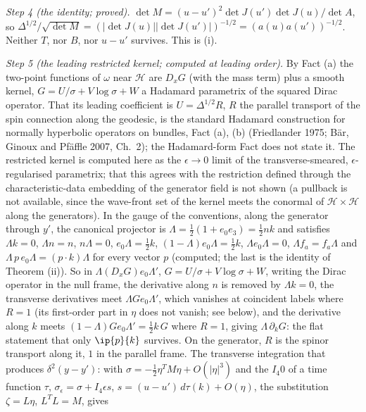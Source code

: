 \emph{Step 4 (the identity; proved).} $\det M = (u - u')^{2}\det J(u')\det J(u)/\det A$, so $\Delta^{1/2}/\sqrt{\det M} = (|\det J(u)||\det J(u')|)^{-1/2} = (a(u)a(u'))^{-1/2}$. Neither $T$, nor $B$, nor $u - u'$ survives. This is (i).

\emph{Step 5 (the leading restricted kernel; computed at leading order).} By Fact (a) the two-point functions of $\omega$ near $\mathcal{H}$ are $D_{x}G$ (with the mass term) plus a smooth kernel, $G = U/\sigma + V\log\sigma + W$ a Hadamard parametrix of the squared Dirac operator. That its leading coefficient is $U = \Delta^{1/2}R$, $R$ the parallel transport of the spin connection along the geodesic, is the standard Hadamard construction for normally hyperbolic operators on bundles, Fact (a), (b) (Friedlander 1975; B\"ar, Ginoux and Pf\"affle 2007, Ch.~2); the Hadamard-form Fact does not state it. The restricted kernel is computed here as the $\epsilon \to 0$ limit of the transverse-smeared, $\epsilon$-regularised parametrix; that this agrees with the restriction defined through the characteristic-data embedding of the generator field is not shown (a pullback is not available, since the wave-front set of the kernel meets the conormal of $\mathcal{H}\times\mathcal{H}$ along the generators). In the gauge of the conventions, along the generator through $y'$, the canonical projector is $\Lambda = \tfrac12(1 + e_{0}e_{3}) = \tfrac12 nk$ and satisfies $\Lambda k = 0$, $\Lambda n = n$, $n\Lambda = 0$, $e_{0}\Lambda = \tfrac12 k$, $(1 - \Lambda)e_{0}\Lambda = \tfrac12 k$, $\Lambda e_{0}\Lambda = 0$, $\Lambda f_{a} = f_{a}\Lambda$ and $\Lambda\,p\,e_{0}\Lambda = (p\cdot k)\Lambda$ for every vector $p$ (computed; the last is the identity of Theorem (ii)). So in $\Lambda(D_{x}G)e_{0}\Lambda'$, $G = U/\sigma + V\log\sigma + W$, writing the Dirac operator in the null frame, the derivative along $n$ is removed by $\Lambda k = 0$, the transverse derivatives meet $\Lambda G e_{0}\Lambda'$, which vanishes at coincident labels where $R = 1$ (its first-order part in $\eta$ does not vanish; see below), and the derivative along $k$ meets $(1 - \Lambda)Ge_{0}\Lambda' = \tfrac12 k\,G$ where $R = 1$, giving $\Lambda\,\partial_{k}G$: the flat statement that only $\ip{p}{k}$ survives. On the generator, $R$ is the spinor transport along it, $1$ in the parallel frame. The transverse integration that produces $\delta^{2}(y - y')$: with $\sigma = -\tfrac12\eta^{T}M\eta + O(|\eta|^{3})$ and the $I_{4}0$ of a time function $\tau$, $\sigma_{\epsilon} = \sigma + I_{4}\epsilon s$, $s = (u - u')\,d\tau(k) + O(\eta)$, the substitution $\zeta = L\eta$, $L^{T}L = M$, gives
